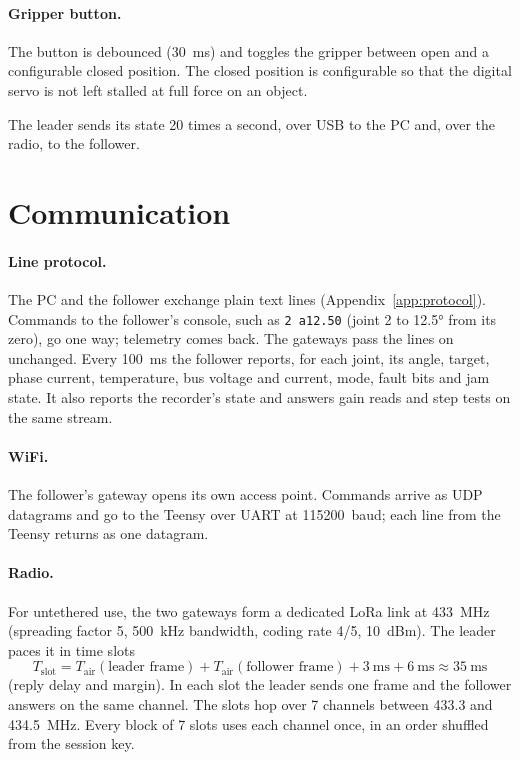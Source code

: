 \documentclass[11pt,a4paper]{article}
\newcommand{\cmd}[1]{\texttt{#1}}
\begin{document}
\paragraph{Gripper button.} The button is debounced (\SI{30}{\milli\second}) and toggles the gripper between
open and a configurable closed position. The closed position is configurable so that the digital servo is not
left stalled at full force on an object.

The leader sends its state 20 times a second, over USB to the PC and, over the radio, to the follower.

\section{Communication}
\label{sec:comm}

\paragraph{Line protocol.} The PC and the follower exchange plain text lines (Appendix~\ref{app:protocol}).
Commands to the follower's console, such as \cmd{2 a12.50} (joint 2 to \ang{12.5} from its zero), go one way;
telemetry comes back. The gateways pass the lines on unchanged. Every \SI{100}{\milli\second} the follower
reports, for each joint, its angle, target, phase current, temperature, bus voltage and current, mode, fault
bits and jam state. It also reports the recorder's state and answers gain reads and step tests on the same
stream.

\paragraph{WiFi.} The follower's gateway opens its own access point. Commands arrive as UDP datagrams and go to
the Teensy over UART at \SI{115200}{baud}; each line from the Teensy returns as one datagram.

\paragraph{Radio.} For untethered use, the two gateways form a dedicated LoRa link at \SI{433}{\mega\hertz}
(spreading factor 5, \SI{500}{\kilo\hertz} bandwidth, coding rate 4/5, \SI{10}{dBm}). The leader paces it in
time slots
\begin{equation}
  T_{\mathrm{slot}}=T_{\mathrm{air}}(\text{leader frame})+T_{\mathrm{air}}(\text{follower frame})
    +\SI{3}{\milli\second}+\SI{6}{\milli\second}\approx\SI{35}{\milli\second}
\end{equation}
(reply delay and margin). In each slot the leader sends one frame and the follower answers on the same channel.
The slots hop over 7 channels between 433.3 and \SI{434.5}{\mega\hertz}. Every block of 7 slots uses each
channel once, in an order shuffled from the session key.
\end{document}
